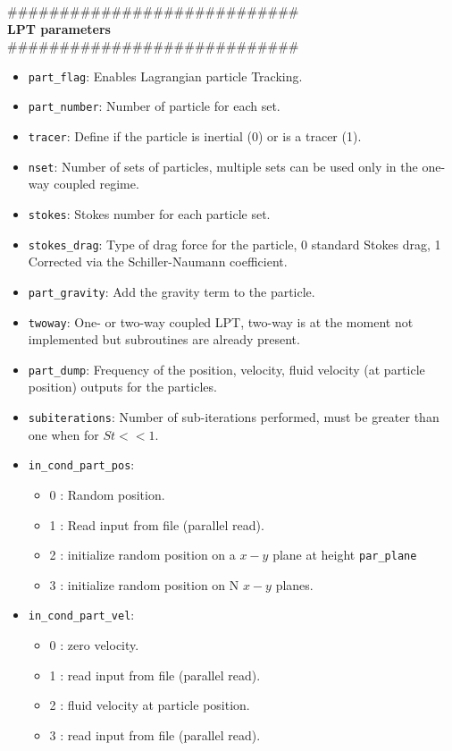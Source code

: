 \#\#\#\#\#\#\#\#\#\#\#\#\#\#\#\#\#\#\#\#\#\#\#\#\#\#\#\#\\
{\bf LPT parameters}\\
\#\#\#\#\#\#\#\#\#\#\#\#\#\#\#\#\#\#\#\#\#\#\#\#\#\#\#\#
\begin{itemize}[label={$\circ$}]
\item \texttt{part\_flag}: Enables Lagrangian particle Tracking.
\item \texttt{part\_number}:  Number of particle for each set.
\item \texttt{tracer}: Define if the particle is inertial (0) or is a tracer (1).
\item \texttt{nset}: Number of sets of particles, multiple sets can be used only in the one-way coupled regime.
\item \texttt{stokes}: Stokes number for each particle set.
\item \texttt{stokes\_drag}: Type of drag force for the particle, 0 standard Stokes drag, 1 Corrected via the Schiller-Naumann coefficient.
\item \texttt{part\_gravity}: Add the gravity term to the particle.
\item \texttt{twoway}: One- or two-way coupled LPT, two-way is at the moment not implemented but subroutines are already present. 
\item \texttt{part\_dump}: Frequency of the position, velocity, fluid velocity (at particle position) outputs for the particles.
\item \texttt{subiterations}: Number of sub-iterations performed, must be greater than one when for $St <<1$.
\item \texttt{in\_cond\_part\_pos}:
\begin{itemize}[label={$\circ$}]
\item 0 : Random position.
\item 1 : Read input from file (parallel read).
\item 2 : initialize random position on a $x-y$ plane at height \texttt{par\_plane}
\item 3 : initialize random position on N $x-y$ planes.
\end{itemize}
\item \texttt{in\_cond\_part\_vel}:
\begin{itemize}[label={$\circ$}]
\item 0 : zero velocity.
\item 1 : read input from file (parallel read).
\item 2 : fluid velocity at particle position.
\item 3 : read input from file (parallel read).
\end{itemize}
\end{itemize}

